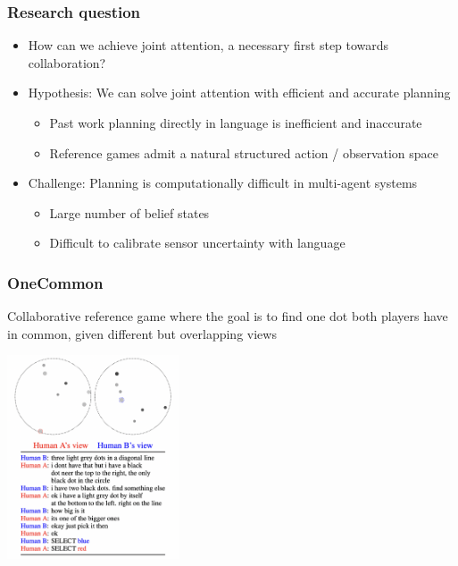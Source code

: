 \documentclass{beamer}
\begin{document}
\begin{frame}
\frametitle{Research question}
\begin{itemize}
\item How can we achieve joint attention, a necessary first step towards collaboration?
\item Hypothesis: We can solve joint attention with efficient and accurate planning
    \begin{itemize}
    \item Past work planning directly in language is inefficient and inaccurate
    \item Reference games admit a natural structured action / observation space
    \end{itemize}
\item Challenge: Planning is computationally difficult in multi-agent systems
    \begin{itemize}
    \item Large number of belief states
    \item Difficult to calibrate sensor uncertainty with language
    \end{itemize}
\end{itemize}
\end{frame}

\begin{frame}
\frametitle{OneCommon}
Collaborative reference game where the goal is to find one dot
both players have in common,
given different but overlapping views
\begin{center}
\includegraphics[width=2in]{img/oc.png}
\end{center}
\end{frame}
\end{document}
